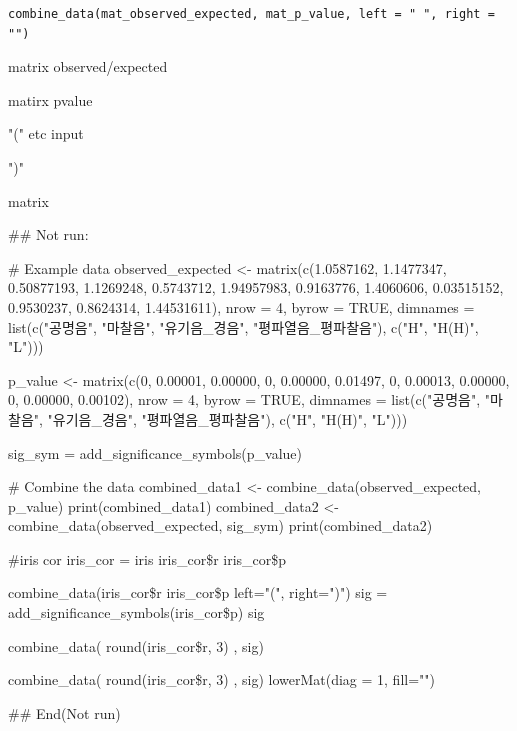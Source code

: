 \documentclass[a4paper]{book}
\begin{document}
%
\begin{Usage}
\begin{verbatim}
combine_data(mat_observed_expected, mat_p_value, left = " ", right = "")
\end{verbatim}
\end{Usage}
%
\begin{Arguments}
\begin{ldescription}
\item[\code{mat\_observed\_expected}] matrix  observed/expected

\item[\code{mat\_p\_value}] matirx pvalue

\item[\code{left}] "(" etc input

\item[\code{right}] ")"
\end{ldescription}
\end{Arguments}
%
\begin{Value}
matrix


\#\# Not run: 

\# Example data
observed\_expected <- matrix(c(1.0587162, 1.1477347, 0.50877193,
                              1.1269248, 0.5743712, 1.94957983,
                              0.9163776, 1.4060606, 0.03515152,
                              0.9530237, 0.8624314, 1.44531611),
                            nrow = 4, byrow = TRUE,
         dimnames = list(c("공명음", "마찰음", "유기음\_경음", "평파열음\_평파찰음"),
                           c("H", "H(H)", "L")))

p\_value <- matrix(c(0, 0.00001, 0.00000,
                    0, 0.00000, 0.01497,
                    0, 0.00013, 0.00000,
                    0, 0.00000, 0.00102),
                  nrow = 4, byrow = TRUE,
       dimnames = list(c("공명음", "마찰음", "유기음\_경음", "평파열음\_평파찰음"),
                      c("H", "H(H)", "L")))

sig\_sym = add\_significance\_symbols(p\_value)

\# Combine the data
combined\_data1 <- combine\_data(observed\_expected, p\_value)
 print(combined\_data1)
combined\_data2 <- combine\_data(observed\_expected, sig\_sym)
 print(combined\_data2)

\#iris cor
iris\_cor = iris 
iris\_cor\$r
iris\_cor\$p

combine\_data(iris\_cor\$r
             iris\_cor\$p
             left="(", right=")")
 sig = add\_significance\_symbols(iris\_cor\$p)
 sig

 combine\_data( round(iris\_cor\$r, 3) , sig)

 combine\_data( round(iris\_cor\$r, 3) , sig) 
 lowerMat(diag = 1, fill="")

## End(Not run)
\end{Value}
\end{document}
